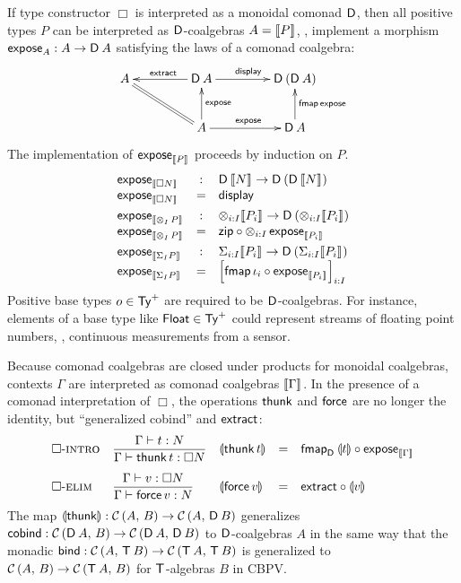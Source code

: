 \documentclass[acmsmall,review,anonymous]{acmart}\settopmatter{printfolios=true,printccs=false,printacmref=false}
\begin{document}
If type constructor $\Box$ is interpreted as a monoidal comonad $\D$,
then all positive types $P$ can be interpreted as $\D$-coalgebras
$A = \den P$, \ie, implement a morphism $\expose[A] : A \to \D\,A$
satisfying the laws of a comonad coalgebra:
\[
\xymatrix@C=10ex{
A  \ar@{=}[dr]
  & \D\,A \ar[l]_{\textract} \ar[r]^{\tdisplay}
  & \D\,(\D\,A)
\\
  & A \ar[u]_{\texpose} \ar[r]^{\texpose}
  & \D\,A \ar[u]_{\tfmap\,\texpose}
}
\]
The implementation of $\expose[\den P]$ proceeds by induction on $P$.
\[
\begin{array}{lcl}
  \expose[\den{\Box N}] & : & {\D\,\den N} \to {\D\,(\D\,\den N)} \\
  \expose[\den{\Box N}] & = & \display
\\[1ex]
  \expose[\den{\tupt I P}] & : & \tupt {i:I} {\den{P_i}} \to \D\,(\tupt {i:I} {\den{P_i}}) \\
  \expose[\den{\tupt I P}] & = & \tzip \comp \tupt {i:I} \expose[\den{P_i}]
\\[1ex]
  \expose[\den{\sumt I P}] & : & \sumt {i:I} {\den{P_i}} \to \D\,(\sumt {i:I} {\den{P_i}}) \\
  \expose[\den{\sumt I P}] & = & \left[\tfmap\,\iota_i \comp \expose[\den{P_i}]\right]_{i:I} \\
\end{array}
\]
Positive base types $o \in \PTy$ are required to be $\D$-coalgebras.
For instance, elements of a base type like
$\Float \in \PTy$ could represent streams of floating point numbers,
\eg, continuous measurements from a sensor.

Because comonad coalgebras are closed under products for monoidal
coalgebras, contexts $\Gamma$ are interpreted as comonad coalgebras
$\den\Gamma$.  In the presence of a comonad interpretation of $\Box$,
the operations $\tthunk$ and $\tforce$ are no longer the identity, but
``generalized cobind'' and $\extract$:
\[
\begin{array}{lllcl}
 \rintro\Box
  & \ru{\oCompTy \Gamma t N
      }{\ValTy \Gamma {\thunk t} {\Box N}}
  & \dent{\thunk t} & = & \fmap[\D]{\dent t} \comp \expose[\den\Gamma]
\\[3ex]
 \relim\Box
  & \ru{\ValTy \Gamma v {\Box N}
      }{\oCompTy \Gamma {\force v} N}
  & \dent{\force v} & = & \textract \comp \dent v
\end{array}
\]
The map $\dent\tthunk : \Hom A B \to \Hom A {\D\,B}$ generalizes
$\tcobind : \Hom{\D\,A} B \to \Hom{\D\,A}{\D\,B}$ to $\D$-coalgebras
$A$ in the same way that the monadic
$\tbind : \Hom{A}{\T\,B} \to \Hom{\T\,A}{\T\,B}$ is generalized to
$\Hom{A}{B} \to \Hom{\T\,A}{B}$ for $\T$-algebras $B$ in CBPV.
\end{document}
